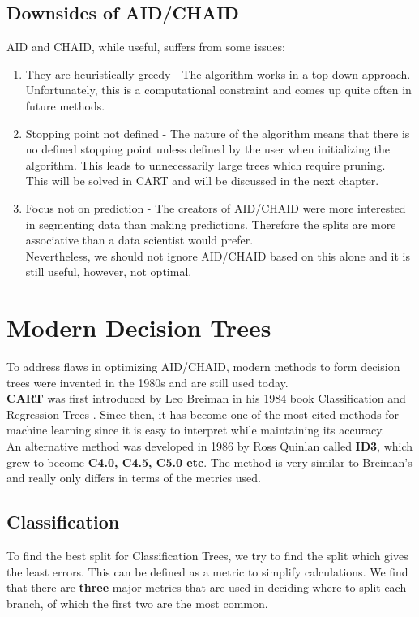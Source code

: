 \documentclass[11pt,a4paper]{report}
\begin{document}
\section{Downsides of AID/CHAID}
AID and CHAID, while useful, suffers from some issues:
\begin{enumerate}
    \item They are heuristically greedy - The algorithm works in a top-down approach.\\
    Unfortunately, this is a computational constraint and comes up quite often in future methods.
    
    \item Stopping point not defined - The nature of the algorithm means that there is no defined stopping point unless defined by the user when initializing the algorithm. This leads to unnecessarily large trees which require pruning.\\
    This will be solved in CART and will be discussed in the next chapter.
    
    \item Focus not on prediction - The creators of AID/CHAID were more interested in segmenting data than making predictions. Therefore the splits are more associative than a data scientist would prefer.\\
    Nevertheless, we should not ignore AID/CHAID based on this alone and it is still useful, however, not optimal.
\end{enumerate}

\chapter{Modern Decision Trees}
To address flaws in optimizing AID/CHAID, modern methods to form decision trees were invented in the 1980s and are still used today.\\
\textbf{CART} was first introduced by Leo Breiman in his 1984 book Classification and Regression Trees \cite{BreimanDT}.
Since then, it has become one of the most cited methods for machine learning since it is easy to interpret while maintaining its accuracy.\\
An alternative method was developed in 1986 by Ross Quinlan \cite{Quinlan} called \textbf{ID3}, which grew to become \textbf{C4.0, C4.5, C5.0 etc}. The method is very similar to Breiman's and really only differs in terms of the metrics used.




\section{Classification}
To find the best split for Classification Trees, we try to find the split which gives the least errors. This can be defined as a metric to simplify calculations.
We find that there are \textbf{three} major metrics that are used in deciding where to split each branch, of which the first two are the most common.
\end{document}
